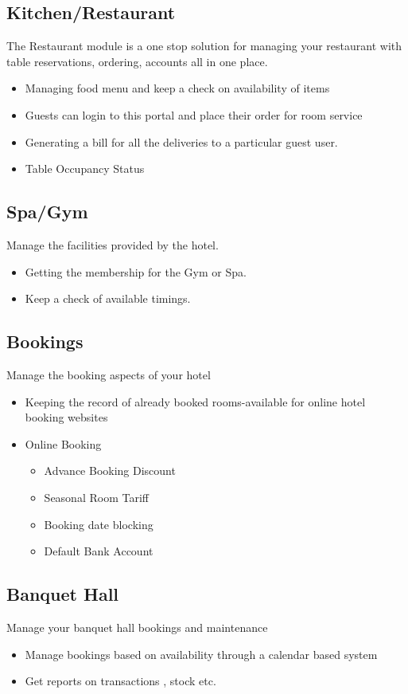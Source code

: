 \documentclass{scrreprt}
\begin{document}
\subsection{Kitchen/Restaurant}
The Restaurant module is a one stop solution for managing your restaurant with table reservations, ordering, accounts all in one place.
\begin{itemize}
    \item Managing food menu and keep a check on availability of  items
    \item Guests can login to this portal and place their order for room service
    \item Generating a bill for all the deliveries to a particular guest user.
    \item Table Occupancy Status
\end{itemize}

\subsection{Spa/Gym}
Manage the facilities provided by the hotel.
\begin{itemize}
    \item Getting the membership for the Gym or Spa.
    \item Keep a check of available timings.
\end{itemize}

\subsection{Bookings}
Manage the booking aspects of your hotel
\begin{itemize}
    \item Keeping the record of already booked rooms-available for online hotel booking websites
    \item Online Booking
\begin{itemize}
    \item Advance Booking Discount
    \item Seasonal Room Tariff
    \item Booking date blocking
    \item Default Bank Account 
\end{itemize}
\end{itemize}

\subsection{Banquet Hall}
Manage your banquet hall bookings and maintenance
\begin{itemize}
\item Manage bookings based on availability through a calendar based system
\item Get reports on transactions , stock etc.
\end{itemize}
\end{document}
